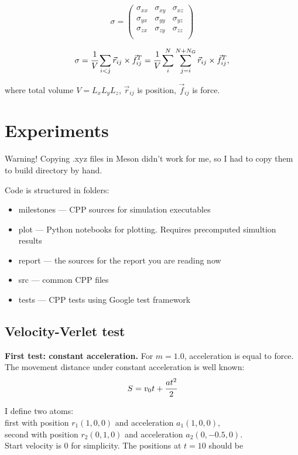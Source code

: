 \documentclass[12pt,a4paper]{article}
\newcommand{\mat}[1]{\vec{#1}}
\begin{document}
\[
\sigma =
\begin{pmatrix}
	\sigma_{xx} &\sigma_{xy} &\sigma_{xz}\\
	\sigma_{yx} &\sigma_{yy} &\sigma_{yz}\\
	\sigma_{zx} &\sigma_{zy} &\sigma_{zz}\\
\end{pmatrix}
\]

\[
\sigma = \cfrac{1}{V} \sum_{i<j} \mat{r}_{ij} \times \mat{f}^T_{ij} = \cfrac{1}{V} \sum_i^{N} \sum_{j=i}^{N+N_G} \mat{r}_{ij} \times \mat{f}^T_{ij},
\]

where total volume $V = L_x L_y L_z$, $\mat{r}_{ij}$ is position, $\mat{f}_{ij}$ is force.


\clearpage

\section{Experiments}
\label{experiments}

Warning! Copying .xyz files in Meson didn't work for me, so I had to copy them to build directory by hand.
	
Code is structured in folders:
\begin{itemize}
	\item milestones --- CPP sources for simulation executables
	\item plot --- Python notebooks for plotting. Requires precomputed simultion results
	\item report --- the sources for the report you are reading now
	\item src --- common CPP files
	\item tests --- CPP tests using Google test framework
\end{itemize}

\subsection*{Velocity-Verlet test}

{\bf First test: constant acceleration.} For $m=1.0$, acceleration is equal to force. The movement distance under constant acceleration is well known: \[ S = v_0 t + \cfrac{at^2}{2} \]

I define two atoms:\\
first with position $r_1(1, 0, 0)$ and acceleration $a_1(1, 0, 0)$,\\
second with position $r_2(0, 1, 0)$ and acceleration $a_2(0, -0.5, 0)$.\\
Start velocity is 0 for simplicity. The positions at $t = 10$ should be
\end{document}

